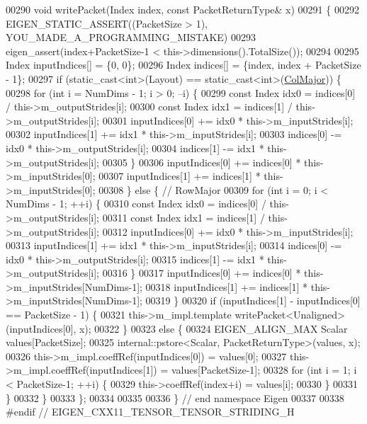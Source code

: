 \begin{DoxyCode}
00290   \textcolor{keywordtype}{void} writePacket(Index index, \textcolor{keyword}{const} PacketReturnType& x)
00291   \{
00292     EIGEN\_STATIC\_ASSERT((PacketSize > 1), YOU\_MADE\_A\_PROGRAMMING\_MISTAKE)
00293     eigen\_assert(index+PacketSize-1 < this->dimensions().TotalSize());
00294 
00295     Index inputIndices[] = \{0, 0\};
00296     Index indices[] = \{index, index + PacketSize - 1\};
00297     \textcolor{keywordflow}{if} (static\_cast<int>(Layout) == static\_cast<int>(\hyperlink{group__enums_ggaacded1a18ae58b0f554751f6cdf9eb13a0cbd4bdd0abcfc0224c5fcb5e4f6669a}{ColMajor})) \{
00298       \textcolor{keywordflow}{for} (\textcolor{keywordtype}{int} i = NumDims - 1; i > 0; --i) \{
00299         \textcolor{keyword}{const} Index idx0 = indices[0] / this->m\_outputStrides[i];
00300         \textcolor{keyword}{const} Index idx1 = indices[1] / this->m\_outputStrides[i];
00301         inputIndices[0] += idx0 * this->m\_inputStrides[i];
00302         inputIndices[1] += idx1 * this->m\_inputStrides[i];
00303         indices[0] -= idx0 * this->m\_outputStrides[i];
00304         indices[1] -= idx1 * this->m\_outputStrides[i];
00305       \}
00306       inputIndices[0] += indices[0] * this->m\_inputStrides[0];
00307       inputIndices[1] += indices[1] * this->m\_inputStrides[0];
00308     \} \textcolor{keywordflow}{else} \{  \textcolor{comment}{// RowMajor}
00309       \textcolor{keywordflow}{for} (\textcolor{keywordtype}{int} i = 0; i < NumDims - 1; ++i) \{
00310         \textcolor{keyword}{const} Index idx0 = indices[0] / this->m\_outputStrides[i];
00311         \textcolor{keyword}{const} Index idx1 = indices[1] / this->m\_outputStrides[i];
00312         inputIndices[0] += idx0 * this->m\_inputStrides[i];
00313         inputIndices[1] += idx1 * this->m\_inputStrides[i];
00314         indices[0] -= idx0 * this->m\_outputStrides[i];
00315         indices[1] -= idx1 * this->m\_outputStrides[i];
00316       \}
00317       inputIndices[0] += indices[0] * this->m\_inputStrides[NumDims-1];
00318       inputIndices[1] += indices[1] * this->m\_inputStrides[NumDims-1];
00319     \}
00320     \textcolor{keywordflow}{if} (inputIndices[1] - inputIndices[0] == PacketSize - 1) \{
00321       this->m\_impl.template writePacket<Unaligned>(inputIndices[0], x);
00322     \}
00323     \textcolor{keywordflow}{else} \{
00324       EIGEN\_ALIGN\_MAX Scalar values[PacketSize];
00325       internal::pstore<Scalar, PacketReturnType>(values, x);
00326       this->m\_impl.coeffRef(inputIndices[0]) = values[0];
00327       this->m\_impl.coeffRef(inputIndices[1]) = values[PacketSize-1];
00328       \textcolor{keywordflow}{for} (\textcolor{keywordtype}{int} i = 1; i < PacketSize-1; ++i) \{
00329         this->coeffRef(index+i) = values[i];
00330       \}
00331     \}
00332   \}
00333 \};
00334 
00335 
00336 \} \textcolor{comment}{// end namespace Eigen}
00337 
00338 \textcolor{preprocessor}{#endif // EIGEN\_CXX11\_TENSOR\_TENSOR\_STRIDING\_H}
\end{DoxyCode}
